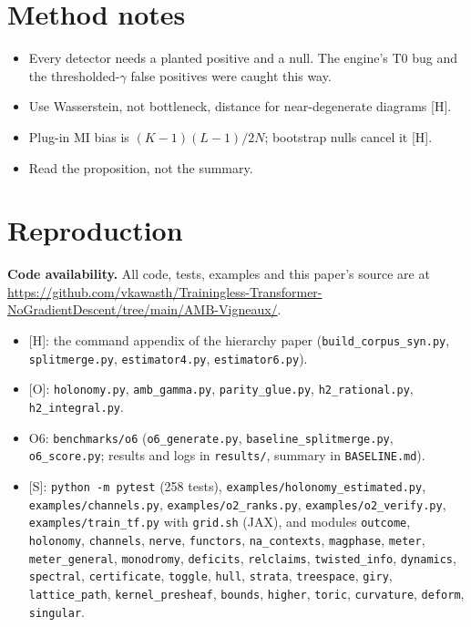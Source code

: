 \documentclass[11pt]{article}
\theoremstyle{definition}
\theoremstyle{remark}
\newcommand{\src}[1]{\textsf{\small[#1]}}
\begin{document}
\section{Method notes}
\begin{itemize}
  \item Every detector needs a planted positive and a null. The engine's T0 bug and the thresholded-$\gamma$ false positives were caught this way.
  \item Use Wasserstein, not bottleneck, distance for near-degenerate diagrams \src{H}.
  \item Plug-in MI bias is $(K-1)(L-1)/2N$; bootstrap nulls cancel it \src{H}.
  \item Read the proposition, not the summary.
\end{itemize}

\section{Reproduction}
\textbf{Code availability.} All code, tests, examples and this paper's source are at \url{https://github.com/vkawasth/Trainingless-Transformer-NoGradientDescent/tree/main/AMB-Vigneaux/}.
\begin{itemize}
  \item \src{H}: the command appendix of the hierarchy paper (\texttt{build\_corpus\_syn.py}, \texttt{splitmerge.py}, \texttt{estimator4.py}, \texttt{estimator6.py}).
  \item \src{O}: \texttt{holonomy.py}, \texttt{amb\_gamma.py}, \texttt{parity\_glue.py}, \texttt{h2\_rational.py}, \texttt{h2\_integral.py}.
  \item O6: \texttt{benchmarks/o6} (\texttt{o6\_generate.py}, \texttt{baseline\_splitmerge.py}, \texttt{o6\_score.py}; results and logs in \texttt{results/}, summary in \texttt{BASELINE.md}).
  \item \src{S}: \texttt{python -m pytest} (258 tests), \texttt{examples/holonomy\_estimated.py}, \texttt{examples/channels.py}, \texttt{examples/o2\_ranks.py}, \texttt{examples/o2\_verify.py}, \texttt{examples/train\_tf.py} with \texttt{grid.sh} (JAX), and modules \texttt{outcome}, \texttt{holonomy}, \texttt{channels}, \texttt{nerve}, \texttt{functors}, \texttt{na\_contexts}, \texttt{magphase}, \texttt{meter}, \texttt{meter\_general}, \texttt{monodromy}, \texttt{deficits}, \texttt{relclaims}, \texttt{twisted\_info}, \texttt{dynamics}, \texttt{spectral}, \texttt{certificate}, \texttt{toggle}, \texttt{hull}, \texttt{strata}, \texttt{treespace}, \texttt{giry}, \texttt{lattice\_path}, \texttt{kernel\_presheaf}, \texttt{bounds}, \texttt{higher}, \texttt{toric}, \texttt{curvature}, \texttt{deform}, \texttt{singular}.
\end{itemize}
\end{document}
